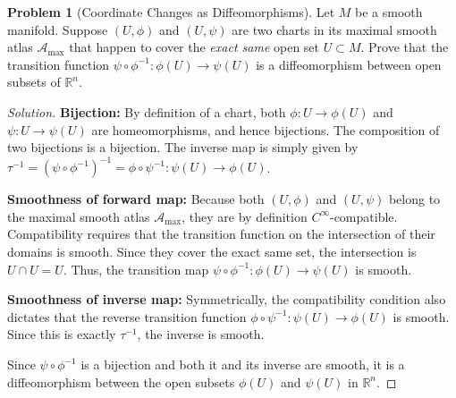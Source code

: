 \documentclass[12pt, a4paper]{article}
\theoremstyle{definition}
\newtheorem{problem}{Problem}
\newenvironment{solution}
  {\renewcommand\qedsymbol{$\blacksquare$}\begin{proof}[Solution]}
  {\end{proof}}
\newcommand{\RR}{\mathbb{R}}
\begin{document}
\begin{problem}[Coordinate Changes as Diffeomorphisms]
Let $M$ be a smooth manifold. Suppose $(U, \phi)$ and $(U, \psi)$ are two charts in its maximal smooth atlas $\mathcal{A}_{\max}$ that happen to cover the \emph{exact same} open set $U \subset M$. 
Prove that the transition function $\psi \circ \phi^{-1} : \phi(U) \to \psi(U)$ is a diffeomorphism between open subsets of $\RR^n$.
\end{problem}
\begin{solution}

\textbf{Bijection:} By definition of a chart, both $\phi: U \to \phi(U)$ and $\psi: U \to \psi(U)$ are homeomorphisms, and hence bijections. The composition of two bijections is a bijection. The inverse map is simply given by $\tau^{-1} = (\psi \circ \phi^{-1})^{-1} = \phi \circ \psi^{-1} : \psi(U) \to \phi(U)$.

\textbf{Smoothness of forward map:} Because both $(U, \phi)$ and $(U, \psi)$ belong to the maximal smooth atlas $\mathcal{A}_{\max}$, they are by definition $C^\infty$-compatible. Compatibility requires that the transition function on the intersection of their domains is smooth. Since they cover the exact same set, the intersection is $U \cap U = U$. Thus, the transition map $\psi \circ \phi^{-1} : \phi(U) \to \psi(U)$ is smooth.

\textbf{Smoothness of inverse map:} Symmetrically, the compatibility condition also dictates that the reverse transition function $\phi \circ \psi^{-1} : \psi(U) \to \phi(U)$ is smooth. Since this is exactly $\tau^{-1}$, the inverse is smooth.

Since $\psi \circ \phi^{-1}$ is a bijection and both it and its inverse are smooth, it is a diffeomorphism between the open subsets $\phi(U)$ and $\psi(U)$ in $\RR^n$.
\end{solution}

\vfill\newpage
\end{document}
